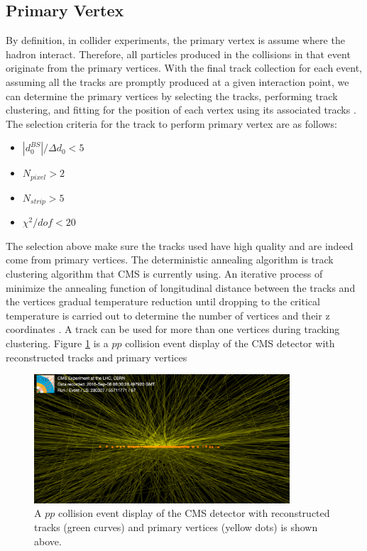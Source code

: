 \subsection{Primary Vertex}

By definition, in collider experiments, the primary vertex is assume where the hadron interact. Therefore, all particles produced in the collisions in that event originate from the primary vertices. With the final track collection for each event, assuming all the tracks are promptly produced at a given interaction point, we can determine the primary vertices by selecting the tracks, performing track clustering, and fitting for the position of each vertex using its associated tracks \cite{CMSTrackComp}. The selection criteria for the track to perform primary vertex are as follows:

\begin{itemize}
\item $|d_0^{BS}|/ \Delta d_0 < 5$
\item $N_{pixel} > 2$
\item $N_{strip} > 5$
\item $\chi^2/dof < 20$
\end{itemize}



The selection above make sure the tracks used have high quality and are indeed come from primary vertices. The deterministic annealing algorithm \cite{DAAlgo} is track clustering algorithm that CMS is currently using. An iterative process of minimize the annealing function of longitudinal distance between the tracks and the vertices gradual temperature reduction until dropping to the critical temperature is carried out to determine the number of vertices and their z coordinates \cite{CMSTrackComp}. A track can be used for more than one vertices during tracking clustering. Figure \ref{CMSEvtDisplay} is a $pp$ collision event display of the CMS detector with reconstructed tracks and primary vertices 

\begin{figure}[hbtp]
\begin{center}
\includegraphics[width=0.85\textwidth]{Figures/Chapter3/CMSEvtDisplay.png}
\caption{A $pp$ collision event display of the CMS detector with reconstructed tracks (green curves) and primary vertices (yellow dots) is shown above.}
\label{CMSEvtDisplay}
\end{center}
\end{figure} 

